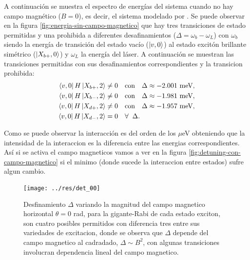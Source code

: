\documentclass[main.tex]{subfiles}
\begin{document}
A continuaci\'on se muestra el espectro de energ\'ias del sistema cuando no hay campo magn\'etico ($B=0$), es decir, el sistema modelado por \parencite{Vargas2022}. Se puede observar en la figura \ref{fig:energia-sin-campo-magnetico} que hay tres transiciones de estado permitidas y una prohibida a diferentes desafinamientos ($\Delta = \omega_b-\omega_L$) con $\omega_b$ siendo la energ\'ia de transici\'on del estado vac\'io ($\ket{v,0}$) al estado excit\'on brillante sim\'etrico ($\ket{X_{b+},0}$) y $\omega_L$ la energ\'ia del l\'aser. A continuaci\'on se muestran las transiciones permitidas con sus desafinamientos correspondientes y la transicion prohibida:
\begin{align}
	\bra{v,0}H\ket{X_{b+},2} &\neq 0 \quad \text{con} \quad \Delta \approx -2.001 \text{ meV},\\
	\bra{v,0}H\ket{X_{b-},2} &\neq 0 \quad \text{con} \quad \Delta \approx -1.981 \text{ meV},\\
	\bra{v,0}H\ket{X_{d+},2} &\neq 0 \quad \text{con} \quad \Delta \approx -1.957 \text{ meV},\\
	\bra{v,0}H\ket{X_{d-},2} &= 0 \quad \forall \;\; \Delta.
\end{align}



Como se puede observar la interacci\'on es del orden de los $\mu$eV obteniendo que la intensidad de la interaccion es la diferencia entre las energias correspondientes. As\'i si se activa el campo magneticos vamos a ver en la figura \ref{fig:detuning-con-campo-magnetico} si el minimo (donde sucede la interaccion entre estados) sufre algun cambio.

\begin{figure}[bh]
	\centering
	\texttt{[image: ../res/det\_θ0]}
	\caption{Desfinamiento $\Delta$ variando la magnitud del campo magnetico horizontal $\theta=0$ rad, para la gigante-Rabi de cada estado exciton, son cuatro posibles permitidos con diferencia tres entre sus variedades de excitacion, donde se observa que $\Delta$ depende del campo magnetico al cadradado, $\Delta \sim B^2$, con algunas transiciones involucran dependencia lineal del campo magnetico.}
	\label{fig:det_θ0}
\end{figure}
\end{document}
